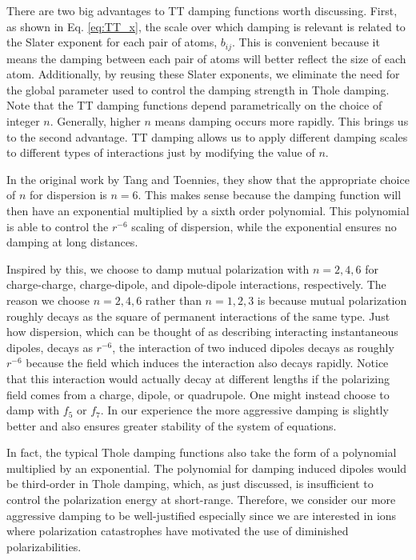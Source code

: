 \documentclass[journal=jacsat,manuscript=article]{achemso}
\begin{document}
There are two big advantages to TT damping functions worth discussing. First, as
shown in Eq. \ref{eq:TT_x}, the scale over which damping is relevant is related to the
Slater exponent for each pair of atoms, $b_{ij}$. This is convenient because it means the
damping between each pair of atoms will better reflect the size of each atom. Additionally,
by reusing these Slater exponents, we eliminate the need for the global parameter used
to control the damping strength in Thole damping. Note that the TT damping functions
depend parametrically on the choice of integer $n$. Generally, higher $n$ means
damping occurs more rapidly. This brings us to the second advantage. TT damping
allows us to apply different damping scales to different types of interactions
just by modifying the value of $n$.

In the original work by Tang and Toennies, they show that the appropriate choice
of $n$ for dispersion is $n=6$. This makes sense because the damping function will
then have an exponential multiplied by a sixth order polynomial. This polynomial is
able to control the $r^{-6}$ scaling of dispersion, while the exponential ensures no
damping at long distances.

Inspired by this, we choose to damp mutual polarization with $n=2,4,6$ for
charge-charge, charge-dipole, and dipole-dipole interactions, respectively.
The reason we choose $n=2,4,6$ rather than $n=1,2,3$ is because mutual polarization
roughly decays as the square of permanent interactions of the same type.
Just how dispersion, which can be thought of as describing interacting instantaneous dipoles,
decays as $r^{-6}$, the interaction of two induced dipoles decays as roughly
$r^{-6}$ because the field which induces the interaction also decays rapidly.
Notice that this interaction would actually decay at different lengths if the polarizing
field comes from a charge, dipole, or quadrupole. One might instead choose to damp
with $f_5$ or $f_7$. In our experience the more aggressive damping is slightly better
and also ensures greater stability of the system of equations.

In fact, the typical Thole damping functions also take the form of a polynomial
multiplied by an exponential. The polynomial for damping induced dipoles would
be third-order in Thole damping, which, as just discussed, is insufficient to control the polarization
energy at short-range. Therefore, we consider our more aggressive damping to be well-justified
especially since we are interested in ions where polarization catastrophes have
motivated the use of diminished polarizabilities.\cite{ponder2010current}
\end{document}
